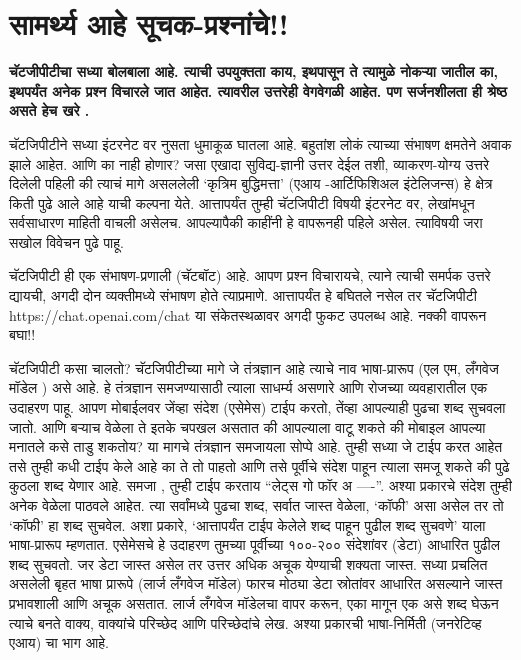 \chapter{सामर्थ्य आहे सूचक-प्रश्नांचे!!}

{\textbf{चॅटजीपीटीचा सध्या बोलबाला आहे.  त्याची उपयुक्तता काय,  इथपासून ते त्यामुळे नोकऱ्या जातील का,  इथपर्यंत अनेक प्रश्न विचारले जात आहेत.  त्यावरील उत्तरेही वेगवेगळी आहेत.  पण सर्जनशीलता ही श्रेष्ठ असते हेच खरे .  }}

चॅटजिपीटीने सध्या इंटरनेट वर नुसता धुमाकूळ घातला आहे. बहुतांश लोकं त्याच्या संभाषण क्षमतेने अवाक झाले आहेत. आणि का नाही होणार? जसा एखादा सुविद्य-ज्ञानी उत्तर देईल तशी, व्याकरण-योग्य उत्तरे दिलेली पहिली की त्याचं मागे असललेली ‘कृत्रिम बुद्धिमत्ता' (एआय -आर्टिफिशिअल इंटेलिजन्स) हे क्षेत्र किती पुढे आले आहे याची कल्पना येते. आत्तापर्यंत तुम्ही चॅटजिपीटी विषयी इंटरनेट वर, लेखांमधून सर्वसाधारण माहिती वाचली असेलच. आपल्यापैकी काहींनी हे वापरूनही पहिले असेल. त्याविषयी जरा सखोल विवेचन पुढे पाहू.

चॅटजिपीटी ही एक संभाषण-प्रणाली (चॅटबॉट) आहे. आपण प्रश्न विचारायचे, त्याने त्याची समर्पक उत्तरे द्यायची, अगदी दोन व्यक्तीमध्ये संभाषण होते त्याप्रमाणे. आत्तापर्यंत हे बघितले नसेल तर चॅटजिपीटी https://chat.openai.com/chat या संकेतस्थळावर अगदी फुकट उपलब्ध आहे. नक्की वापरून बघा!!

चॅटजिपीटी कसा चालतो?
चॅटजिपीटीच्या मागे जे तंत्रज्ञान आहे त्याचे नाव भाषा-प्रारूप (एल एम, लँगवेज मॉडेल ) असे आहे. हे तंत्रज्ञान समजण्यासाठी त्याला साधर्म्य असणारे आणि रोजच्या व्यवहारातील एक उदाहरण पाहू. आपण मोबाईलवर जेंव्हा संदेश (एसेमेस) टाईप करतो, तेंव्हा आपल्याही पुढचा शब्द सुचवला जातो. आणि बऱ्याच वेळेला ते इतके चपखल असतात की आपल्याला वाटू शकते की मोबाइल आपल्या मनातले कसे ताडु शकतोय? या मागचे तंत्रज्ञान समजायला सोप्पे आहे. तुम्ही सध्या जे टाईप करत आहेत तसे तुम्ही कधी टाईप केले आहे का ते तो पाहतो आणि तसे पूर्वीचे संदेश पाहून त्याला समजू शकते की पुढे कुठला शब्द येणार आहे. समजा , तुम्ही टाईप करताय ``लेट्स गो फॉर अ ----''. अश्या प्रकारचे संदेश तुम्ही अनेक वेळेला पाठवले आहेत. त्या सर्वांमध्ये पुढचा शब्द, सर्वात जास्त वेळेला, ‘कॉफी' असा असेल तर तो ‘कॉफी' हा शब्द सुचवेल. अशा प्रकारे, ‘आत्तापर्यंत टाईप केलेले शब्द पाहून पुढील शब्द सुचवणे' याला भाषा-प्रारूप म्हणतात. एसेमेसचे हे उदाहरण तुमच्या पूर्वीच्या १००-२०० संदेशांवर (डेटा) आधारित पुढील शब्द सुचवतो. जर डेटा जास्त असेल तर उत्तर अधिक अचूक येण्याची शक्यता जास्त. सध्या प्रचलित असलेली बृहत भाषा प्रारूपे (लार्ज लँगवेज मॉडेल) फारच मोठ्या डेटा स्रोतांवर आधारित असल्याने जास्त प्रभावशाली आणि अचूक असतात. लार्ज लँगवेज मॉडेलचा वापर करून, एका मागून एक असे शब्द घेऊन त्याचे बनते वाक्य, वाक्यांचे परिच्छेद आणि परिच्छेदांचे लेख. अश्या प्रकारची भाषा-निर्मिती (जनरेटिव्ह एआय) चा भाग आहे.

